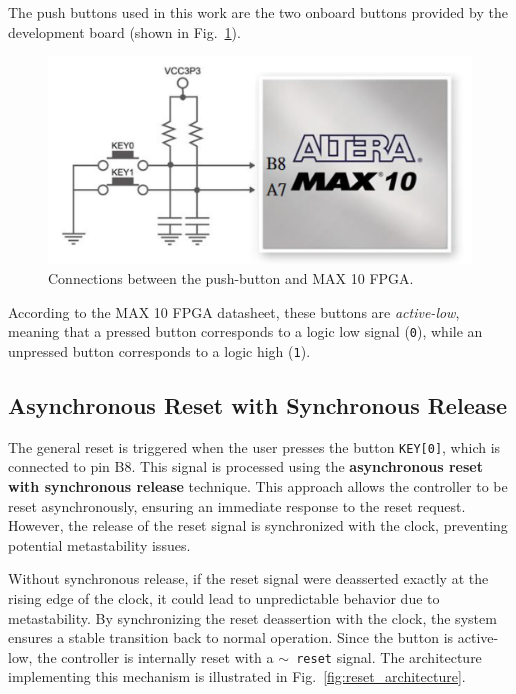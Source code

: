 \documentclass[11pt]{report}
\begin{document}
The push buttons used in this work are the two onboard buttons provided by the development board (shown in Fig.~\ref{fig:push_buttons}). 

\begin{figure}[!h]
    \centering
    \includegraphics[width=0.8\linewidth]{images/controller/buttons.png}
    \caption{Connections between the push-button and MAX 10 FPGA.}
    \label{fig:push_buttons}
\end{figure}

According to the MAX 10 FPGA datasheet, these buttons are \textit{active-low}, meaning that a pressed button corresponds to a logic low signal (\texttt{0}), while an unpressed button corresponds to a logic high (\texttt{1}). 

\subsection{Asynchronous Reset with Synchronous Release}

The general reset is triggered when the user presses the button \texttt{KEY[0]}, which is connected to pin B8. This signal is processed using the \textbf{asynchronous reset with synchronous release} technique. This approach allows the controller to be reset asynchronously, ensuring an immediate response to the reset request. However, the release of the reset signal is synchronized with the clock, preventing potential metastability issues.

Without synchronous release, if the reset signal were deasserted exactly at the rising edge of the clock, it could lead to unpredictable behavior due to metastability. By synchronizing the reset deassertion with the clock, the system ensures a stable transition back to normal operation. Since the button is active-low, the controller is internally reset with a \texttt{$\mathtt{\sim}$ reset} signal. The architecture implementing this mechanism is illustrated in Fig.~\ref{fig:reset_architecture}.
\end{document}
